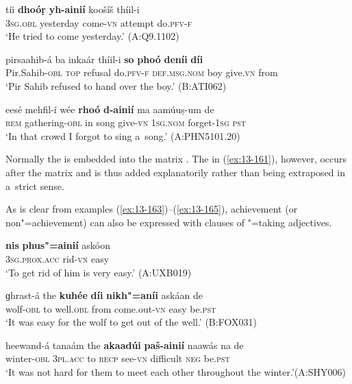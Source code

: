 \begin{exe}
\ex
\label{ex:13-160}
\gll tíi \textbf{dhoóṛ} \textbf{yh-ainií} koošíš thíil-i \\
\textsc{3sg.obl} yesterday come-\textsc{vn} attempt do.\textsc{pfv-f} \\
\glt `He tried to come yesterday.' (A:Q9.1102)

\ex
\label{ex:13-161}
\gll pirsaahib-á ba inkaár thíil-i \textbf{so} \textbf{phoó} \textbf{deníi} \textbf{díi}\\
Pir.Sahib-\textsc{obl} \textsc{top} refusal do.\textsc{pfv-f} \textsc{def.msg.nom} boy  give.\textsc{vn} from\\
\glt `Pir Sahib refused to hand over the boy.' (B:ATI062)

\ex
\label{ex:13-162}
\gll eesé mehfil-í wée \textbf{rhoó} \textbf{d-ainií} ma  aamúuṣ-um de \\
\textsc{rem} gathering-\textsc{obl} in song give-\textsc{vn} \textsc{1sg.nom} forget-\textsc{1sg} \textsc{pst} \\
\glt `In that crowd I forgot to sing a~song.' (A:PHN5101.20) 
\end{exe}

Normally the   is embedded into the matrix . The  in (\ref{ex:13-161}), however, occurs after the matrix  and is thus added explanatorily rather than being extraposed in a~strict sense.


As is clear from examples (\ref{ex:13-163})--(\ref{ex:13-165}), achievement (or non"=achievement) can also be expressed with  clauses of "=taking adjectives.

\begin{exe}
\ex
\label{ex:13-163}
\gll \textbf{nis} \textbf{phus"=ainií} askóon \\
\textsc{3sg.prox.acc} rid-\textsc{vn} easy \\
\glt `To get rid of him is very easy.' (A:UXB019)

\ex
\label{ex:13-164}
\gll ɡhrast-á the \textbf{kuhée} \textbf{díi} \textbf{nikh"=aníi} askáan de  \\
wolf-\textsc{obl} to well.\textsc{obl} from come.out-\textsc{vn} easy be.\textsc{pst}  \\
\glt `It was easy for the wolf to get out of the well.' (B:FOX031)

\ex
\label{ex:13-165}
\gll heewand-á tanaám the \textbf{akaadúi} \textbf{paš-ainií} naawás  na de \\
winter-\textsc{obl} \textsc{3pl.acc} to \textsc{recp} see-\textsc{vn} difficult \textsc{neg} be.\textsc{pst} \\
\glt `It was not hard for them to meet each other throughout the winter.'\newline (A:SHY006) 
\end{exe}

